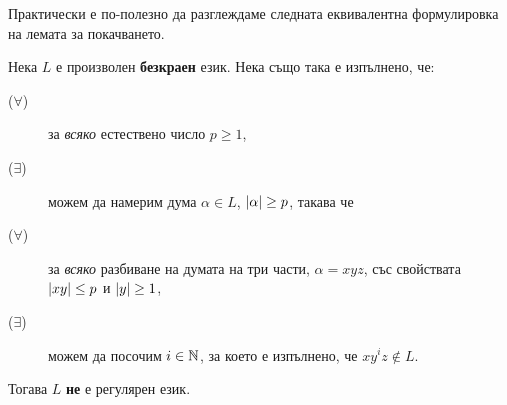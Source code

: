Практически е по-полезно да разглеждаме следната еквивалентна формулировка на лемата за покачването.

\begin{cor}
  \label{cor:pumping-reg}
  Нека $L$ е произволен {\bf безкраен} език. Нека също така е изпълнено, че:
  \begin{description}
  \item[($\forall$)]
    за {\em всяко} естествено число $p \geq 1$,
  \item[($\exists$)]
    можем да намерим дума $\alpha \in L$, $\lvert{\alpha}\rvert\geq p$, такава че
  \item[($\forall$)]
    за {\em всяко} разбиване на думата на три части, $\alpha = xyz$, със свойствата $\lvert{xy}\rvert \leq p$ и $\lvert{y}\rvert \geq 1$,
  \item[($\exists$)]
    можем да посочим $i \in \mathbb{N}$, за което е изпълнено, че $xy^iz \not\in L$.
  \end{description}  
  Тогава $L$ {\bf не} е регулярен език.
\end{cor}
